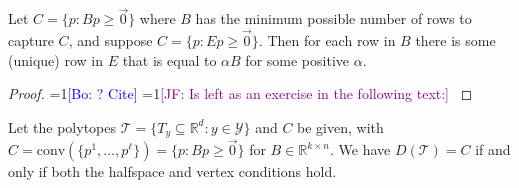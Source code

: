 \documentclass[anon]{colt2020} %
\newcommand{\Comments}{1}
\newcommand{\mynote}[2]{\ifnum\Comments=1\textcolor{#1}{#2}\fi}
\newcommand{\jessie}[1]{\mynote{purple}{[JF: #1]}}
\newcommand{\bo}[1]{\mynote{blue}{[Bo: #1]}}
\newcommand{\reals}{\mathbb{R}}
\newcommand{\T}{\mathcal{T}}
\newcommand{\Y}{\mathcal{Y}}
\newcommand{\conv}{\mathrm{conv}}
\begin{document}
\begin{lemma} \label{lemma:E-to-B}
  Let $C = \{p : Bp \geq \vec 0 \}$ where $B$ has the minimum possible number of rows to capture $C$, and suppose $C = \{p : Ep \geq \vec 0 \}$.
  Then for each row in $B$ there is some (unique) row in $E$ that is equal to $\alpha B$ for some positive $\alpha$.
\end{lemma}
\begin{proof}
  \bo{? Cite} \jessie{Is left as an exercise in the following text:} \cite[Exercise 2.15]{ziegler2012lectures}
\end{proof}


\begin{theorem} \label{thm:vertex-halfspace-opt}
  Let the polytopes $\T = \{T_y \subseteq \reals^d : y \in \Y\}$ and $C$ be given, with $C = \conv(\{p^1,\ldots,p^{\ell}\}) = \{p: Bp \geq \vec 0\}$ for $B \in \reals^{k \times n}$.
  We have $D(\T) = C$ if and only if both the halfspace and vertex conditions hold.
\end{theorem}
\end{document}
